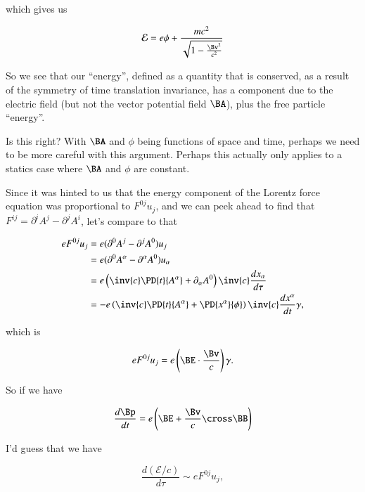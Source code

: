 which gives us

\begin{align*}
\mathcal{E} = e \phi + \frac{m c^2}{\sqrt{1 - \frac{\Bv^2}{c^2}}} 
\end{align*}

So we see that our ``energy'', defined as a quantity that is conserved, as a result of the symmetry of time translation invariance, has a component due to the electric field (but not the vector potential field $\BA$), plus the free particle ``energy''.

Is this right?  With $\BA$ and $\phi$ being functions of space and time, perhaps we need to be more careful with this argument.  Perhaps this actually only applies to a statics case where $\BA$ and $\phi$ are constant.

Since it was hinted to us that the energy component of the Lorentz force equation was proportional to $F^{0j} u_j$, and we can peek ahead to find that $F^{ij} = \partial^i A^j - \partial^j A^i$, let's compare to that

\begin{align*}
e F^{0 j} u_j
&=
e (\partial^0 A^j - \partial^j A^0) u_j \\
&=
e (\partial^0 A^\alpha - \partial^\alpha A^0) u_\alpha \\
&=
e \left( \inv{c} \PD{t}{A^\alpha} + \partial_\alpha A^0 \right) \inv{c} \frac{dx_\alpha}{d\tau} \\
&=
-e \left( \inv{c} \PD{t}{A^\alpha} + \PD{x^\alpha}{\phi} \right) \inv{c} \frac{dx^\alpha}{dt} \gamma,
\end{align*}

which is

\begin{equation}\label{eqn:relativisticElectrodynamicsT3:910}
e F^{0 j} u_j = e \left(\BE \cdot \frac{\Bv}{c}\right) \gamma.
\end{equation}

So if we have

\begin{equation}\label{eqn:relativisticElectrodynamicsT3:920}
\frac{d\Bp}{dt} = e \left( \BE + \frac{\Bv}{c} \cross \BB \right)
\end{equation}

I'd guess that we have

\begin{equation}\label{eqn:relativisticElectrodynamicsT3:940}
\frac{d(\mathcal{E}/c)}{d\tau} \sim e F^{0 j} u_j,
\end{equation}

